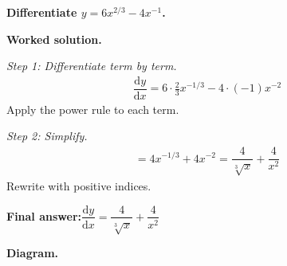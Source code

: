 \documentclass[11pt]{article}
\newcommand{\question}[1]{\par\medskip\noindent\textbf{#1}\par}
\begin{document}
\question{Differentiate \( y = 6x^{2/3} - 4x^{-1} \).}

\textbf{Worked solution.}

\textit{Step 1: Differentiate term by term.}
\[\begin{gathered}
\dfrac{\mathrm{d}y}{\mathrm{d}x} = 6 \cdot \tfrac{2}{3} x^{-1/3} - 4 \cdot (-1) x^{-2}
\end{gathered}\]
Apply the power rule to each term.

\textit{Step 2: Simplify.}
\[\begin{gathered}
= 4 x^{-1/3} + 4 x^{-2} = \dfrac{4}{\sqrt[3]{x}} + \dfrac{4}{x^2}
\end{gathered}\]
Rewrite with positive indices.

\begin{answerbox}
\textbf{Final answer:}\quad \(\displaystyle  \dfrac{\mathrm{d}y}{\mathrm{d}x} = \dfrac{4}{\sqrt[3]{x}} + \dfrac{4}{x^2} \)
\end{answerbox}
\textbf{Diagram.}
\end{document}
